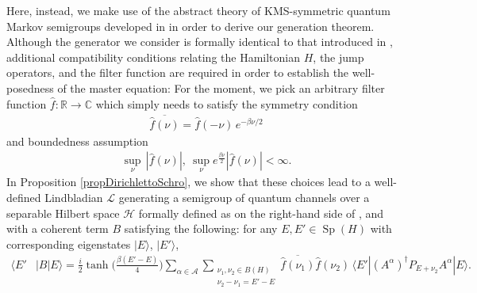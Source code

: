 \documentclass[11pt]{amsart}
\newcommand{\1}{\mathbbm{1}}
\theoremstyle{plain}
\theoremstyle{definition}
\theoremstyle{remark}
\numberwithin{equation}{section}
\begin{document}
Here, instead, we make use of the abstract theory of KMS-symmetric quantum Markov semigroups developed in \cite{Albeverio1977,Davies1992,Goldstein1995} in order to derive our generation theorem. Although the generator we consider is formally identical to that introduced in \cite{ding2025efficient}, additional compatibility conditions relating the Hamiltonian $H$, the jump operators, and the filter function are required in order to establish the well-posedness of the master equation: 
For the moment, we pick an arbitrary filter function $\widehat{f}:\mathbb{R}\to\mathbb{C}$ which simply needs to satisfy the symmetry condition
\begin{align}\label{eq:symmetryintro}
\overline{\widehat{f}(\nu)}=\widehat{f}(-\nu)\,e^{-\beta\nu/2}
\end{align}
and boundedness assumption 
\begin{align}
\sup_\nu\,|\widehat{f}(\nu)|,\   \sup_{\nu}e^{\frac{\beta\nu}{2}}|\widehat{f}(\nu)| <\infty.
\end{align}
In Proposition \ref{propDirichlettoSchro}, we show that these choices lead to a well-defined Lindbladian $\mathcal{L}$ generating a semigroup of quantum channels over a separable Hilbert space $\mathcal{H}$ formally defined as on the right-hand side of ,
and with a coherent term $B$ satisfying the following:
for any $E,E'\in \operatorname{Sp}(H)$ with corresponding eigenstates $|E\rangle$, $|E'\rangle$,
\begin{equation}
\begin{split}\label{eq:Bintro} \langle E'&|B|E\rangle=\frac{i}{2}\operatorname{tanh}\Big(\tfrac{\beta(E'-E)}{4}\Big)\sum_{\alpha\in\mathcal{A}}\sum_{\substack{\nu_1,\nu_2\in B(H)\\\nu_2-\nu_1=E'-E}}\overline{\widehat{f}(\nu_1)}\widehat{f}(\nu_2)\,\langle E'|(A^\alpha)^\dagger P_{E+\nu_2}A^\alpha |E\rangle. 
\end{split}
\end{equation}
\smallskip
\end{document}
